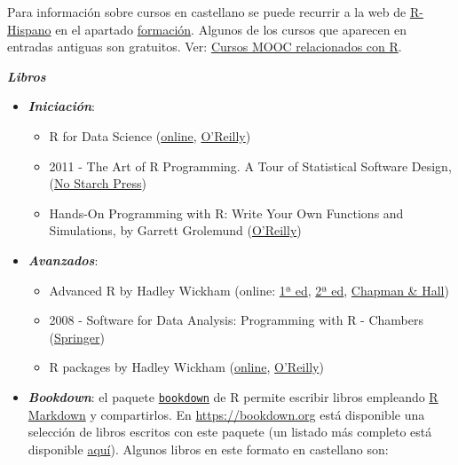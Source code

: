 \documentclass[]{book}
\begin{document}
Para información sobre cursos en castellano se puede recurrir a la web
de \href{http://r-es.org/}{R-Hispano} en el apartado
\href{http://r-es.org/category/formacion}{formación}. Algunos de los
cursos que aparecen en entradas antiguas son gratuitos. Ver:
\href{http://r-es.org/2016/02/12/cursos-masivos-y-otra-formacion-on-line-sobre-r/}{Cursos
MOOC relacionados con R}.

\textbf{\emph{Libros}}

\begin{itemize}
\item
  \textbf{\emph{Iniciación}}:

  \begin{itemize}
  \item
    R for Data Science (\href{http://r4ds.had.co.nz/}{online},
    \href{http://shop.oreilly.com/product/0636920034407.do}{O'Reilly})
  \item
    2011 - The Art of R Programming. A Tour of Statistical Software
    Design, (\href{https://www.nostarch.com/artofr.htm}{No Starch
    Press})
  \item
    Hands-On Programming with R: Write Your Own Functions and
    Simulations, by Garrett Grolemund
    (\href{http://shop.oreilly.com/product/0636920028574.do}{O'Reilly})
  \end{itemize}
\item
  \textbf{\emph{Avanzados}}:

  \begin{itemize}
  \item
    Advanced R by Hadley Wickham (online:
    \href{http://adv-r.had.co.nz/}{1ª ed},
    \href{https://adv-r.hadley.nz/}{2ª ed},
    \href{https://www.amazon.com/dp/1466586966}{Chapman \& Hall})
  \item
    2008 - Software for Data Analysis: Programming with R - Chambers
    (\href{http://www.springer.com/la/book/9780387759357}{Springer})
  \item
    R packages by Hadley Wickham
    (\href{http://r-pkgs.had.co.nz/}{online},
    \href{http://shop.oreilly.com/product/0636920034421.do}{O'Reilly})
  \end{itemize}
\item
  \textbf{\emph{Bookdown}}: el paquete
  \href{https://bookdown.org}{\texttt{bookdown}} de R permite escribir
  libros empleando \href{http://rmarkdown.rstudio.com}{R Markdown} y
  compartirlos. En \url{https://bookdown.org} está disponible una
  selección de libros escritos con este paquete (un listado más completo
  está disponible \href{https://bookdown.org/home/archive/}{aquí}).
  Algunos libros en este formato en castellano son:


\end{itemize}
\end{document}
